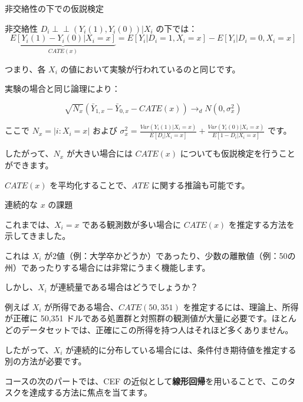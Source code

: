 \documentclass[11pt,handout]{beamer}
\newenvironment{wideitemize}{\itemize\addtolength{\itemsep}{10pt}}{\enditemize}
\newenvironment{wideitemizeshort}{\itemize}{\enditemize}
\newcommand{\indep}{\perp\!\!\!\!\perp}
\begin{document}
\begin{frame}{非交絡性の下での仮説検定}
\begin{wideitemizeshort}
\item
非交絡性 $D_i \indep (Y_i(1),Y_i(0)) | X_i$ の下では：
{\small $$ \underbrace{E[Y_i(1) - Y_i(0) | X_i =x]}_{CATE(x)} = E[Y_i | D_i = 1, X_i =x ] - E[Y_i | D_i = 0, X_i =x]$$ }

\noindent つまり、各 $X_i$ の値において実験が行われているのと同じです。

\pause
\item
実験の場合と同じ論理により：

{\small $$\sqrt{N_x} (\bar{Y}_{1,x} -  \bar{Y}_{0,x} - CATE(x)) \rightarrow_d N(0 , \sigma_x^2)$$} 

\noindent ここで $N_x = |i : X_i = x|$ および 
{\scriptsize $\sigma_x^2 = \frac{Var(Y_i(1) | X_i = x)}{E[D_i|X_i = x]} + \frac{Var(Y_i(0)|X_i =x)}{E[1-D_i|X_i=x]} $} です。

\pause 
\item
したがって、$N_x$ が大きい場合には $CATE(x)$ についても仮説検定を行うことができます。

\pause
\item
$CATE(x)$ を平均化することで、$ATE$ に関する推論も可能です。

\end{wideitemizeshort}	
	
\end{frame}

\begin{frame}{連続的な $x$ の課題}
	
\begin{wideitemize} 
\item
これまでは、$X_i=x$ である観測数が多い場合に $CATE(x)$ を推定する方法を示してきました。

\item
これは $X_i$ が2値（例：大学卒かどうか）であったり、少数の離散値（例：50の州）であったりする場合には非常にうまく機能します。

\pause
\item
しかし、$X_i$ が連続量である場合はどうでしょうか？

\pause
\item
例えば $X_i$ が所得である場合、$CATE(50,351)$ を推定するには、理論上、所得が正確に 50,351 ドルである処置群と対照群の観測値が大量に必要です。ほとんどのデータセットでは、正確にこの所得を持つ人はそれほど多くありません。

\pause
\item
したがって、$X_i$ が連続的に分布している場合には、条件付き期待値を推定する別の方法が必要です。

\pause
\item
コースの次のパートでは、CEF の近似として\textbf{線形回帰}を用いることで、このタスクを達成する方法に焦点を当てます。
\end{wideitemize}	
	
\end{frame} 
\end{document}
